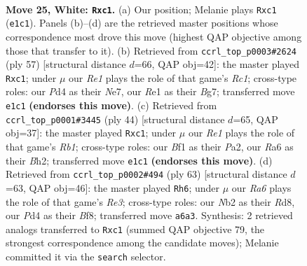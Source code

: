 \documentclass[11pt]{article}
\begin{document}
\clearpage

\begin{figure}[p]\centering
\begin{subfigure}{0.46\textwidth}\centering
\resizebox{\linewidth}{!}{%
\newchessgame
\chessboard[
  setfen={2r1b1k1/p4pp1/R3pn2/1p5p/3P1P2/1P4PP/1N2P3/2r1RBK1 w - - 0 25},
  showmover=false,
  pgfstyle=straightmove, color=movearrow, markmove={e1-c1}
]}
\caption{}
\end{subfigure}\hfill
\begin{subfigure}{0.46\textwidth}\centering
\resizebox{\linewidth}{!}{%
\newchessgame
\chessboard[
  setfen={2r5/4nrbk/1p2N1p1/4p2p/1p2P2P/3P1PP1/6BK/2R2R2 b - - 0 29},
  showmover=false,
  pgfstyle=straightmove, color=movearrow, markmove={c8-c1}
]}
\caption{}
\end{subfigure}
\\[4pt]
\begin{subfigure}{0.46\textwidth}\centering
\resizebox{\linewidth}{!}{%
\newchessgame
\chessboard[
  setfen={5rk1/pp5p/3nNbp1/4p3/4p1P1/4P2P/PP2KP1B/1Rr5 w - - 0 23},
  showmover=false,
  pgfstyle=straightmove, color=movearrow, markmove={b1-c1}
]}
\caption{}
\end{subfigure}\hfill
\begin{subfigure}{0.46\textwidth}\centering
\resizebox{\linewidth}{!}{%
\newchessgame
\chessboard[
  setfen={3r1bk1/5p2/pp2r3/2p3p1/PnN3P1/1RB1P2p/1P2KP1P/6R1 b - - 0 32},
  showmover=false,
  pgfstyle=straightmove, color=movearrow, markmove={e6-h6}
]}
\caption{}
\end{subfigure}
\caption{\textbf{Move 25, White: \texttt{Rxc1}.} (a) Our position; Melanie plays \texttt{Rxc1} (\texttt{e1c1}). Panels (b)--(d) are the retrieved master positions whose correspondence most drove this move (highest QAP objective among those that transfer to it). (b) Retrieved from \texttt{ccrl\_top\_p0003\#2624} (ply 57) [structural distance $d$=66, QAP obj=42]: the master played \texttt{Rxc1}; under $\mu$ our \emph{Re1} plays the role of that game's \emph{Rc1}; cross-type roles: our \emph{P}d4 as their \emph{N}e7, our \emph{R}e1 as their \emph{B}g7; transferred move \texttt{e1c1} \textbf{(endorses this move)}. (c) Retrieved from \texttt{ccrl\_top\_p0001\#3445} (ply 44) [structural distance $d$=65, QAP obj=37]: the master played \texttt{Rxc1}; under $\mu$ our \emph{Re1} plays the role of that game's \emph{Rb1}; cross-type roles: our \emph{B}f1 as their \emph{P}a2, our \emph{R}a6 as their \emph{B}h2; transferred move \texttt{e1c1} \textbf{(endorses this move)}. (d) Retrieved from \texttt{ccrl\_top\_p0002\#494} (ply 63) [structural distance $d$=63, QAP obj=46]: the master played \texttt{Rh6}; under $\mu$ our \emph{Ra6} plays the role of that game's \emph{Re3}; cross-type roles: our \emph{N}b2 as their \emph{R}d8, our \emph{P}d4 as their \emph{B}f8; transferred move \texttt{a6a3}. Synthesis: 2 retrieved analogs transferred to \texttt{Rxc1} (summed QAP objective 79, the strongest correspondence among the candidate moves); Melanie committed it via the \texttt{search} selector.}
\label{fig:thought-m48}
\end{figure}
\end{document}
